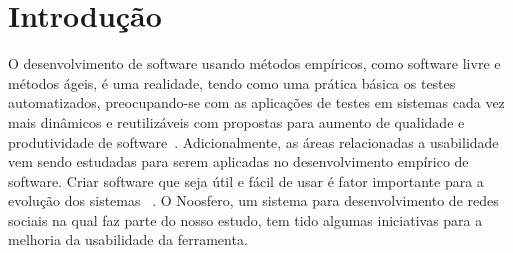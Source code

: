 \section{Introdução}
\label{introducao}

O desenvolvimento de software usando métodos empíricos, como software livre e métodos ágeis, é uma realidade, tendo como uma prática básica os testes automatizados, preocupando-se com as aplicações de testes em sistemas cada vez mais dinâmicos e reutilizáveis com propostas para aumento de qualidade e produtividade de software~\cite{vicente2010}.
%
Adicionalmente, as áreas relacionadas a usabilidade vem sendo estudadas para serem aplicadas no desenvolvimento empírico de software. Criar software que seja útil e fácil de usar é fator importante para a evolução dos sistemas ~\cite{santos2012}.
%
O Noosfero, um sistema para desenvolvimento de redes sociais na qual faz parte do nosso estudo, tem tido algumas iniciativas para a melhoria da usabilidade da ferramenta.
